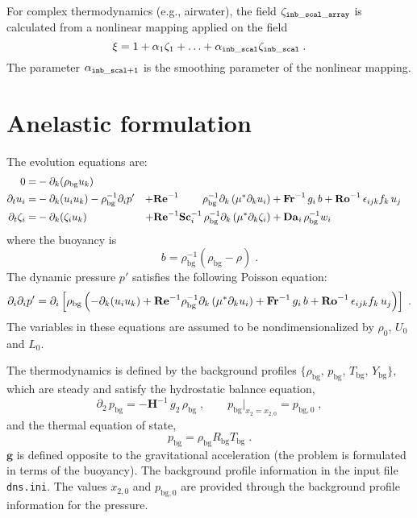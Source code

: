 For complex thermodynamics (e.g., airwater), the field $\zeta_\mathrm{\tt inb\_scal\_array}$ is calculated from a nonlinear mapping applied on the field
\begin{equation}
  \xi =1+\alpha_1\zeta_1+\ldots+\alpha_\mathrm{\tt inb\_scal}\zeta_\mathrm{\tt inb\_scal}\;.
\end{equation}
The parameter $\alpha_\mathrm{\tt inb\_scal+1}$ is the smoothing parameter of the nonlinear mapping.

\section{Anelastic formulation}

The evolution equations are:
\begin{subequations}
  \begin{align}
    0                 =& -\partial_k(\rho_\mathrm{bg}u_k)   & \\
    \partial_t  u_i   =& -\partial_k ( u_i u_k )-\rho_\mathrm{bg}^{-1}\partial_i p' &
    +\mathrm{\bf Re}^{-1}\qquad\;\rho_\mathrm{bg}^{-1}\partial_k \left( \mu^{*} \partial_k u_i\right) & +\mathrm{\bf Fr}^{-1}\, g_i\,b+\mathrm{\bf Ro}^{-1}\,\epsilon_{ijk} f_k\,u_j  \\
    \partial_t\zeta_i =& -\partial_k (\zeta_i u_k) &
    + \mathrm{\bf Re}^{-1}\mathrm{\bf Sc}_i^{-1}\, \rho_\mathrm{bg}^{-1}\partial_k \left( \mu^{*}\partial_k\zeta_i\right) &+ \mathrm{\bf Da}_i\,\rho_\mathrm{bg}^{-1}w_i
  \end{align}
\end{subequations}
where the buoyancy is
\begin{equation}
  b=\rho_\mathrm{bg}^{-1}(\rho_\mathrm{bg}-\rho) \;.
\end{equation}
The dynamic pressure $p'$ satisfies the following Poisson equation:
\begin{equation}
  \partial_i\partial_ip'=\partial_i\left[\rho_\mathrm{bg}\left(
  -\partial_k ( u_i u_k )+\mathrm{\bf Re}^{-1}\rho_\mathrm{bg}^{-1}\partial_k \left( \mu^{*} \partial_k u_i\right) +\mathrm{\bf Fr}^{-1}\, g_i\,b+\mathrm{\bf Ro}^{-1}\,\epsilon_{ijk} f_k\,u_j
  \right)\right]\;.
\end{equation}
The variables in these equations are assumed to be nondimensionalized by $\rho_0$, $U_0$ and $L_0$.

The thermodynamics is defined by the background profiles $\{\rho_\mathrm{bg},\, p_\mathrm{bg},\, T_\mathrm{bg},\, Y_\mathrm{bg}\}$, which are steady and satisfy the hydrostatic balance equation,
\begin{equation}
  \partial_2\,p_\mathrm{bg}=-\mathbf{H}^{-1}\, g_2\,\rho_\mathrm{bg}\;,\qquad p_\mathrm{bg}|_{x_2=x_{2,0}}=p_{\mathrm{bg},0}\;,
\end{equation}
and the thermal equation of state,
\begin{equation}
  p_\mathrm{bg}  = \rho_\mathrm{bg} R_\mathrm{bg} T_\mathrm{bg} \;.
\end{equation}
$\mathbf{g}$ is defined opposite to the gravitational acceleration (the problem is formulated in terms of the buoyancy). The background profile information in the input file {\tt dns.ini}. The values $x_{2,0}$ and $p_\mathrm{bg,0}$ are provided through the background profile information for the pressure. 


